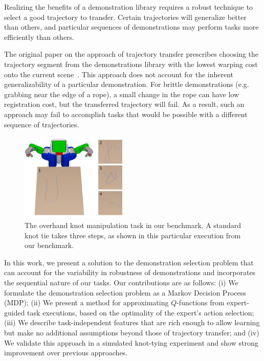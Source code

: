 \documentclass[conference]{IEEEtran}
\begin{document}
Realizing the benefits of a demonstration library requires a robust
technique to select a good trajectory to transfer.  Certain
trajectories will generalize better than others, and particular
sequences of demonstrations may perform tasks more efficiently than
others.

The original paper on the approach of trajectory transfer
prescribes choosing the trajectory segment from the demonstrations
library with the lowest warping cost onto the current
scene~\citep{Schulmanetal_ISRR2013}.  This approach does not account
for the inherent generalizability of a particular demonstration. For
brittle demonstrations (e.g. grabbing near the edge of a rope), a
small change in the rope can have low registration cost, but the
transferred trajectory will fail.  As a result, such an approach may
fail to accomplish tasks that would be possible with a different
sequence of trajectories.

\begin{figure}[t]
  \centering
    \noindent
    \includegraphics[width=0.45\textwidth]{figures/knot_steps_num.png}
  \caption{The overhand knot manipulation task in our benchmark.
           A standard knot tie takes three steps, as shown in this
           particular execution from our benchmark.}
  \label{fig:knot_steps}
\end{figure}

In this work, we present a solution to the demonstration selection
problem that can account for the variability in robustness of
demonstrations and incorporates the sequential nature of our
tasks. Our contributions are as follows: (i) We formulate the
demonstration selection problem as a Markov Decision Process (MDP);
(ii) We present a method for approximating $Q$-functions from
expert-guided task executions, based on the optimality of the expert's
action selection; (iii) We describe task-independent features that are
rich enough to allow learning but make no additional assumptions
beyond those of trajectory transfer; and (iv) We validate this
approach in a simulated knot-tying experiment and show strong
improvement over previous approaches.
\end{document}
